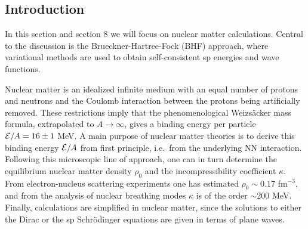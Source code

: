 \subsection{Introduction}

In this section and section 8 we will focus on nuclear matter calculations.
Central
to the discussion is the Brueckner-Hartree-Fock (BHF) approach, where
variational methods are used to obtain self-consistent
sp energies and wave functions.

Nuclear matter is an idealized infinite medium with an equal number
of protons and neutrons and the Coulomb interaction between the protons
being artificially removed. These restrictions imply that the phenomenological
Weizs\"{a}cker mass formula, extrapolated to $A\rightarrow \infty$, gives
a binding energy per particle ${\cal E}/A=16\pm 1$ MeV. A main purpose 
of nuclear matter theories is to derive this binding energy
${\cal E}/A$ from first principle,
i.e.\ from the underlying NN interaction. Following this microscopic
line of approach, one can in turn determine the equilibrium nuclear matter
density $\rho_0$ and the incompressibility coefficient $\kappa$.
From electron-nucleus scattering experiments one has estimated 
$\rho_0 \sim 0.17 $ fm$^{-3}$, and from the analysis of nuclear
breathing modes $\kappa$ is of the order $\sim 200$ MeV.
Finally, calculations are simplified in 
nuclear matter, since the solutions to either the Dirac or the 
sp Schr\"{o}dinger equations are given in terms of plane waves.

